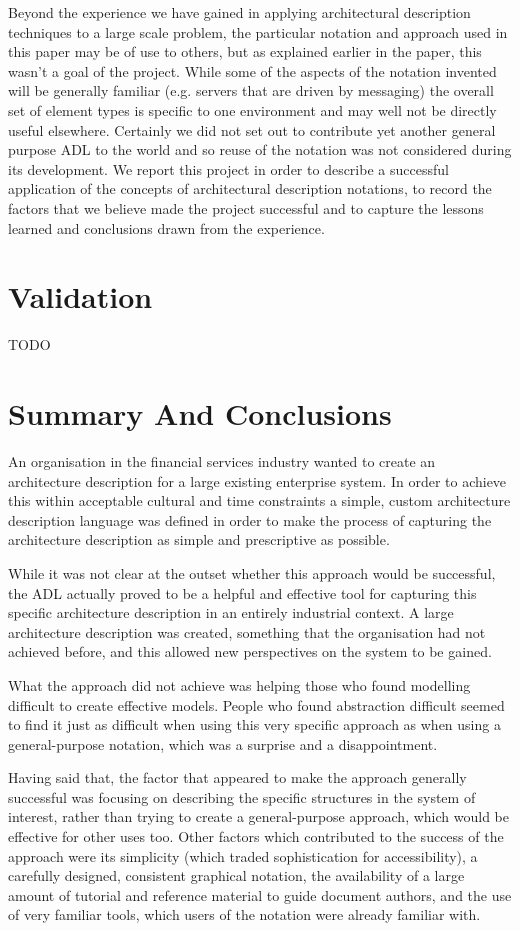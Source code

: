   Beyond the experience we have gained in applying architectural description techniques to a large scale problem, the particular notation and approach used in this paper may be of use to others, but as explained earlier in the paper, this wasn't a goal of the project. While some of the aspects of the notation invented will be generally familiar (e.g. servers that are driven by messaging) the overall set of element types is specific to one environment and may well not be directly useful elsewhere.  Certainly we did not set out to contribute yet another general purpose ADL to the world and so reuse of the notation was not considered during its development.  We report this project in order to describe a successful application of the concepts of architectural description notations, to record the factors that we believe made the project successful and to capture the lessons learned and conclusions drawn from the experience.

\section{Validation}

TODO

\section{Summary And Conclusions}

  An organisation in the financial services industry wanted to create an architecture description for a large existing enterprise system.  In order to achieve this within acceptable cultural and time constraints a simple, custom architecture description language was defined in order to make the process of capturing the architecture description as simple and prescriptive as possible.

  While it was not clear at the outset whether this approach would be successful, the ADL actually proved to be a helpful and effective tool for capturing this specific architecture description in an entirely industrial context.  A large architecture description was created, something that the organisation had not achieved before, and this allowed new perspectives on the system to be gained.

  What the approach did not achieve was helping those who found modelling difficult to create effective models.  People who found abstraction difficult seemed to find it just as difficult when using this very specific approach as when using a general-purpose notation, which was a surprise and a disappointment.

  Having said that, the factor that appeared to make the approach generally successful was focusing on describing the specific structures in the system of interest, rather than trying to create a general-purpose approach, which would be effective for other uses too.  Other factors which contributed to the success of the approach were its simplicity (which traded sophistication for accessibility), a carefully designed, consistent graphical notation, the availability of a large amount of tutorial and reference material to guide document authors, and the use of very familiar tools, which users of the notation were already familiar with.

